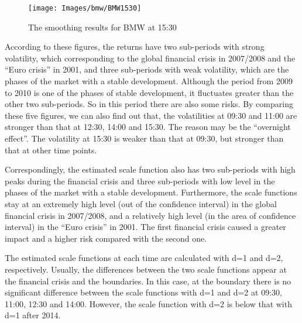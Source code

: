 \begin{figure}[!htbp]
	\centering
	\texttt{[image: Images/bmw/BMW1530]}
	\caption[The smoothing results for BMW at 15:30]{The smoothing results for BMW at 15:30}
	\label{fig:BMW1530}
\end{figure}


According to these figures, the returns have two sub-periods with strong volatility, which corresponding to the global financial crisis in 2007/2008 and the ``Euro crisis'' in 2001, and three sub-periods with weak volatility, which are the phases of the market with a stable development. Although the period from 2009 to 2010 is one of the phases of stable development, it fluctuates greater than the other two sub-periods. So in this period there are also some risks. By comparing these five figures, we can also find out that, the volatilities at 09:30 and 11:00 are stronger than that at 12:30, 14:00 and 15:30. The reason may be the ``overnight effect''. The volatility at 15:30 is weaker than that at 09:30, but stronger than that at other time points.

Correspondingly, the estimated scale function also has two sub-periods with high peaks during the financial crisis and three sub-periods with low level in the phases of the market with a stable development. Furthermore, the scale functions stay at an extremely high level (out of the confidence interval) in the global financial crisis in 2007/2008, and a relatively high level (in the area of confidence interval) in the ``Euro crisis'' in 2001. The first financial crisis caused a greater impact and a higher risk compared with the second one. 

The estimated scale functions at each time are calculated with d=1 and d=2, respectively. Usually, the differences between the two scale functions appear at the financial crisis and the boundaries. In this case, at the boundary there is no significant difference between the scale functions with d=1 and d=2 at 09:30, 11:00, 12:30 and 14:00. However, the scale function with d=2 is below that with d=1 after 2014. 

